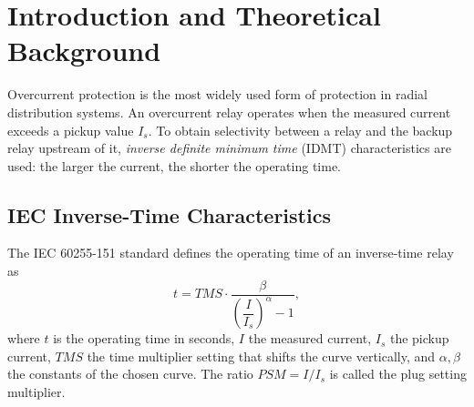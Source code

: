 \documentclass[12pt, a4paper]{article}
\begin{document}
\begin{abstract}
This report presents the design and implementation of a digital overcurrent relay that follows the IEC Very Inverse time--current characteristic. An Arduino Uno measures the load current through a ZMCT103C current transformer module, estimates its RMS value, and compares it with a pickup setting $I_s$. When the current exceeds $I_s$, the relay calculates the required operating time from the Time Multiplier Setting ($TMS$) and trips a relay module once the fault has lasted long enough; short disturbances that clear earlier do not cause a trip. Measurements, trip time and status are shown on an I2C LCD, two LEDs indicate the relay state, and a push button resets the relay after a trip. The prototype is rated for a 12\,V AC / 1\,A test bench. The report describes the hardware, the signal-processing method, the trip algorithm, the expected time--current behavior, and the limitations of the prototype together with possible improvements.
\end{abstract}

\newpage
\tableofcontents
\newpage

\section{Introduction and Theoretical Background}
Overcurrent protection is the most widely used form of protection in radial distribution systems. An overcurrent relay operates when the measured current exceeds a pickup value $I_s$. To obtain selectivity between a relay and the backup relay upstream of it, \emph{inverse definite minimum time} (IDMT) characteristics are used: the larger the current, the shorter the operating time.

\subsection{IEC Inverse-Time Characteristics}
The IEC 60255-151 standard \cite{iec60255} defines the operating time of an inverse-time relay as
\begin{equation}
  t = TMS \cdot \frac{\beta}{\left(\dfrac{I}{I_s}\right)^{\alpha} - 1},
  \label{eq:iec}
\end{equation}
where $t$ is the operating time in seconds, $I$ the measured current, $I_s$ the pickup current, $TMS$ the time multiplier setting that shifts the curve vertically, and $\alpha,\beta$ the constants of the chosen curve. The ratio $PSM = I/I_s$ is called the plug setting multiplier.
\end{document}
